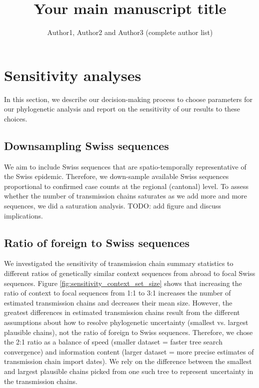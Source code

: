 \documentclass[9pt,twoside,lineno]{pnas-new}
\title{Your main manuscript title}
\author{Author1, Author2 and Author3 (complete author list)}
\begin{document}
\instructionspage  

\maketitle

\SItext


\section{Sensitivity analyses}

In this section, we describe our decision-making process to choose parameters for our phylogenetic analysis and report on the sensitivity of our results to these choices. 

\subsection{Downsampling Swiss sequences}
We aim to include Swiss sequences that are spatio-temporally representative of the Swiss epidemic. Therefore, we down-sample available Swiss sequences proportional to confirmed case counts at the regional (cantonal) level. To assess whether the number of transmission chains saturates as we add more and more sequences, we did a saturation analysis. TODO: add figure and discuss implications.

\subsection{Ratio of foreign to Swiss sequences}
We investigated the sensitivity of transmission chain summary statistics to different ratios of genetically similar context sequences from abroad to focal Swiss sequences. Figure \ref{fig:sensitivity_context_set_size} shows that increasing the ratio of context to focal sequences from 1:1 to 3:1 increases the number of estimated transmission chains and decreases their mean size. However, the greatest differences in estimated transmission chains result from the different assumptions about how to resolve phylogenetic uncertainty (smallest vs. largest plausible chains), not the ratio of foreign to Swiss sequences. Therefore, we chose the 2:1 ratio as a balance of speed (smaller dataset = faster tree search convergence) and information content (larger dataset = more precise estimates of transmission chain import dates). We rely on the difference between the smallest and largest plausible chains picked from one such tree to represent uncertainty in the transmission chains.
\end{document}
